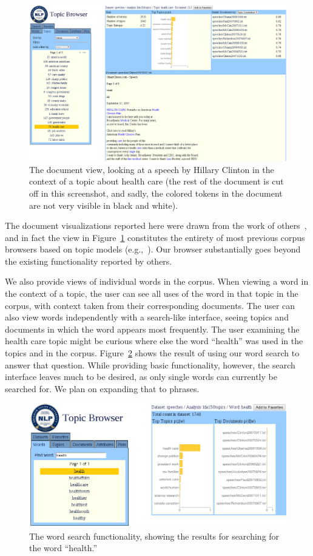 \documentclass{article}
\begin{document}
\begin{figure}
  \centering
  \includegraphics[width=\textwidth]{document}
  \caption{The document view, looking at a speech by Hillary Clinton in the
  context of a topic about health care (the rest of the document is cut off in
  this screenshot, and sadly, the colored tokens in the document are not very
  visible in black and white).}
  \label{fig:document}
\end{figure}

The document visualizations reported here were drawn from the work of
others~\cite{blei-2003-latent-dirichlet-allocation}, and in fact the view in
Figure~\ref{fig:document} constitutes the entirety of most previous corpus
browsers based on topic models (e.g.,~\cite{blei-arxiv-corpus-browser}).  Our
browser substantially goes beyond the existing functionality reported by
others.

We also provide views of individual words in the corpus.  When viewing a word
in the context of a topic, the user can see all uses of the word in that topic
in the corpus, with context taken from their corresponding documents.  The user
can also view words independently with a search-like interface, seeing topics
and documents in which the word appears most frequently.  The user examining
the health care topic might be curious where else the word ``health'' was used
in the topics and in the corpus.  Figure~\ref{fig:word} shows the result of
using our word search to answer that question.  While providing basic
functionality, however, the search interface leaves much to be desired, as only
single words can currently be searched for.  We plan on expanding that to
phrases.

\begin{figure}
  \centering
  \includegraphics[width=.72\textwidth]{word}
  \caption{The word search functionality, showing the results for searching for
  the word ``health.''}
  \label{fig:word}
\end{figure}
\end{document}
